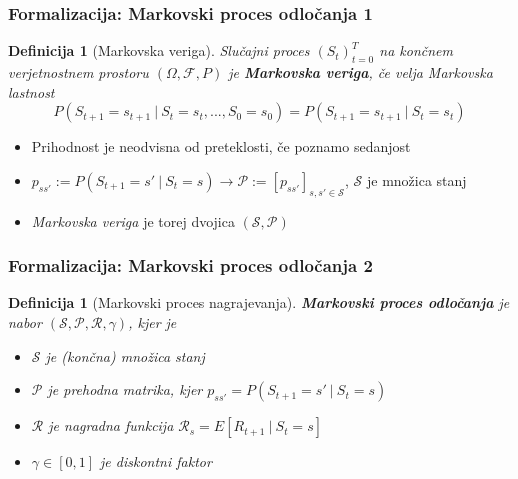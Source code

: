 \documentclass{beamer}    %
\newtheorem{definicija}[izrek]{Definicija}
\begin{document}
\begin{frame}
    \frametitle{Formalizacija: Markovski proces odločanja 1}
    \begin{definicija}[Markovska veriga]
        Slučajni proces $(S_t)_{t=0}^T$ na končnem verjetnostnem prostoru 
        $(\Omega, \mathcal{F},  P)$ je \textbf{Markovska veriga}, če velja Markovska lastnost
        $$
        P(S_{t+1} = s_{t+1}~|~S_{t} = s_{t}, ..., S_0 = s_0) = P(S_{t+1} = s_{t+1}~|~S_{t} = s_{t})
        $$
    \end{definicija}
    \pause
    \medskip
    \begin{itemize}
        \item Prihodnost je neodvisna od preteklosti, če poznamo sedanjost
        \pause
        \item $p_{ss'} := P(S_{t+1} = s'~|~S_{t} = s) \rightarrow
                \mathcal{P} := [p_{ss'}]_{s,s'\in \mathcal{S} }$, $\mathcal{S}$ 
                je množica stanj
        \item \emph{Markovska veriga} je torej dvojica $(\mathcal{S}, \mathcal{P})$
    \end{itemize}
    
\end{frame}


\begin{frame}
    \frametitle{Formalizacija: Markovski proces odločanja 2}
    \begin{definicija}[Markovski proces nagrajevanja]
        \textbf{Markovski proces odločanja} je nabor 
        $(\mathcal{S}, \mathcal{P}, \mathcal{R}, \gamma)$, kjer je
        \begin{itemize}
            \item $\mathcal{S}$ je (končna) množica stanj
            \item $\mathcal{P}$ je prehodna matrika, kjer $p_{ss'} = P(S_{t+1} = s'~|~S_{t} = s)$
            \item $\mathcal{R}$ je nagradna funkcija $\mathcal{R}_s = E[R_{t+1}~|~S_{t} = s]$
            \item $\gamma \in [0, 1]$ je diskontni faktor
        \end{itemize}
    \end{definicija}
\end{frame}
\end{document}
